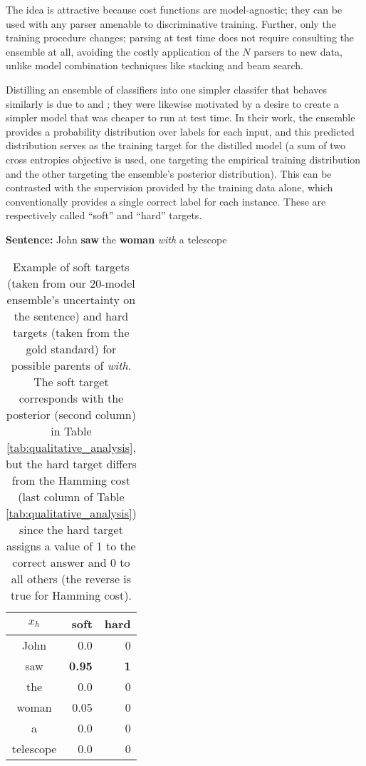\documentclass[11pt,letterpaper]{article}
\newcommand{\ignore}[1]{}
\newcommand{\nascomment}[1]{\ignore{\textcolor{blue}{{\textbf{[#1 --\textsc{nas}]}}}}}
\newcommand{\miguelcomment}[1]{\ignore{\textcolor{red}{{\textbf{[#1 --\textsc{miguel}]}}}}}
\begin{document}
The idea is attractive because cost functions are model-agnostic; they can be used with any parser amenable to discriminative training.  Further, only the training procedure changes; parsing at test time does not require consulting the ensemble at all, avoiding the costly application of the $N$ parsers to new data, unlike model combination techniques like stacking and beam search.

Distilling an ensemble of classifiers into one simpler classifer that behaves similarly is due to  and ; they were likewise motivated by a desire to create a simpler model that was cheaper to run at test time.  In their work, the ensemble provides a probability distribution over labels for each input, and this predicted distribution serves as the training target for the distilled model (a sum of two cross entropies objective is used, one targeting the empirical training distribution and the other targeting the ensemble's posterior distribution).
This can be contrasted with the supervision provided by the training data alone, which conventionally provides a single correct label for each instance.  These are respectively called ``soft'' and ``hard'' targets.

\begin{table}[!ht]
\ignore{\miguelcomment{Same here}}
 \textbf{Sentence: }John \textbf{saw} the \textbf{woman} \emph{with} a telescope
\begin{center} \begin{tabular}{|c|r|r|} \hline
$x_h$                                & soft  & hard                        \\ \hline
John                                              & 0.0 & 0 \\ 
 saw                                               & \textbf{0.95} &  \textbf{1}                                                   \\
the & 0.0 & 0 \\
woman                                             & 0.05  &  0                                                 \\
a & 0.0 & 0 \\
telescope & 0.0 & 0 \\
\hline                                                
\end{tabular}
\end{center}
\caption{Example of soft targets (taken from \ignore{\nascomment{check that this is actually what our model does, or fix}} our 20-model ensemble's uncertainty on the sentence) and hard targets (taken from the gold standard) for possible parents of \emph{with}. The soft target corresponds with the posterior (second column) in Table \ref{tab:qualitative_analysis}, but the hard target differs from the Hamming cost (last column of Table \ref{tab:qualitative_analysis}) since the hard target assigns a value of 1 to the correct answer and 0 to all others (the reverse is true for Hamming cost).
\label{tab:soft_hard_targets}}
\end{table}
\end{document}
